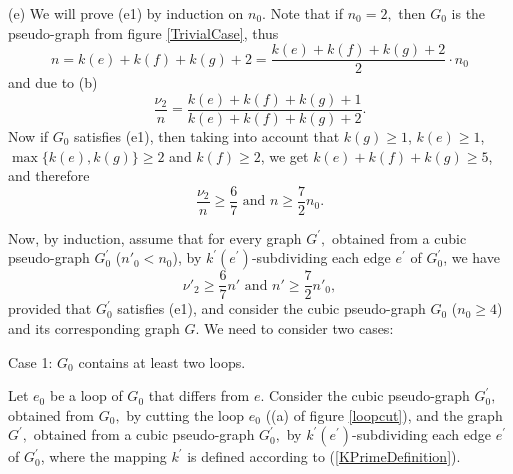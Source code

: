 \documentclass[fleqn,12pt,twoside]{article}
\newenvironment{proof}[1][Proof.]{\begin{trivlist}
\item[\hskip \labelsep {\bfseries #1}]}{\end{trivlist}}
\begin{document}
\begin{proof}
(e) We will prove (e1) by induction on $n_0$. Note that if $n_0=2,$
then $G_{0}$ is the pseudo-graph from figure \ref{TrivialCase}, thus\begin{equation*}
n =k(e)+k(f)+k(g)+2=\frac{k(e)+k(f)+k(g)+2}{2}\cdot n_0
\end{equation*}and due to (b)\begin{equation*}
\frac{\nu _{2}}{n}=\frac{k(e)+k(f)+k(g)+1}{k(e)+k(f)+k(g)+2}.
\end{equation*}Now if $G_{0}$ satisfies (e1), then taking into account that $k(g)\geq 1$, $k(e)\geq 1$, $\max \{k(e),k(g)\}\geq 2$ and $k(f)\geq 2$, we get $k(e)+k(f)+k(g)\geq 5$, and therefore
\begin{equation*}
\frac{\nu _{2}}{n}\geq \frac{6}{7}\text{ and }n \geq \frac{7}{2}n_0.
\end{equation*}

Now, by induction, assume that for every graph $G^{\prime },$
obtained from a cubic pseudo-graph $G_{0}^{\prime }$ ($n'_0<n_0$),
by $k^{\prime }(e^{\prime }) $-subdividing each edge $e^{\prime }$
of $G_{0}^{\prime }$, we have
\begin{equation*}
\nu' _{2}\geq \frac{6}{7}n' \text{ and }n'\geq \frac{7}{2}n'_0,
\end{equation*}provided that $G_{0}^{\prime }$ satisfies (e1), and consider the
cubic pseudo-graph $G_{0}$ ($n_0 \geq 4$) and its corresponding
graph $G$. We need to consider two cases:

Case 1: $G_{0}$ contains at least two loops.

Let $e_{0}$ be a loop of $G_{0}$ that differs from $e$. Consider the
cubic pseudo-graph $G_{0}^{\prime },$ obtained from $G_{0},$ by
cutting the loop $e_{0}$ ((a) of figure \ref{loopcut}), and the graph $G^{\prime },$ obtained from a cubic pseudo-graph $G_{0}^{\prime },$ by $k^{\prime }(e^{\prime })$-subdividing each edge $e^{\prime }$ of $G_{0}^{\prime }$, where the mapping $k^{\prime }$ is defined according to (\ref{KPrimeDefinition}).


\end{proof}
\end{document}
